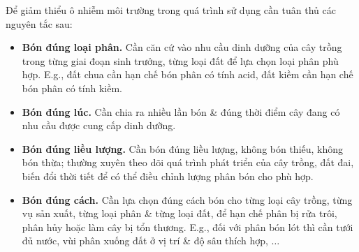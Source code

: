 \documentclass{article}
\begin{document}
Để giảm thiểu ô nhiễm môi trường trong quá trình sử dụng cần tuân thủ các nguyên tắc sau:
\begin{itemize}
	\item \textbf{Bón đúng loại phân.} Cần căn cứ vào nhu cầu dinh dưỡng của cây trồng trong từng giai đoạn sinh trưởng, từng loại đất để lựa chọn loại phân phù hợp. E.g., đất chua cần hạn chế bón phân có tính acid, đất kiềm cần hạn chế bón phân có tính kiềm.
	\item \textbf{Bón đúng lúc.} Cần chia ra nhiều lần bón \& đúng thời điểm cây đang có nhu cầu được cung cấp dinh dưỡng.
	\item \textbf{Bón đúng liều lượng.} Cần bón đúng liều lượng, không bón thiếu, không bón thừa; thường xuyên theo dõi quá trình phát triển của cây trồng, đất đai, biến đổi thời tiết để có thể điều chỉnh lượng phân bón cho phù hợp.
	\item \textbf{Bón đúng cách.} Cần lựa chọn đúng cách bón cho từng loại cây trồng, từng vụ sản xuất, từng loại phân \& từng loại đất, để hạn chế phân bị rửa trôi, phân hủy hoặc làm cây bị tổn thương. E.g., đối với phân bón lót thì cần tưới đủ nước, vùi phân xuống đất ở vị trí \& độ sâu thích hợp, $\ldots$
\end{itemize}
\noindent{}


\printbibliography[heading=bibintoc]
	
\end{document}
